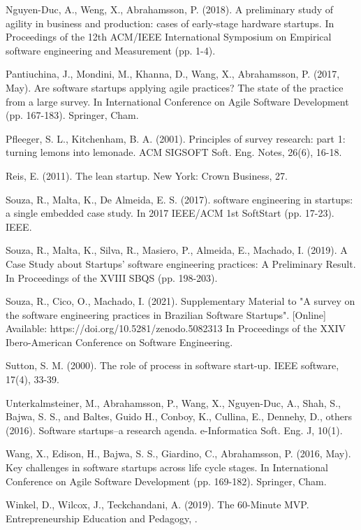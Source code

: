 \documentclass[runningheads]{llncs}
\begin{document}
\begin{thebibliography}{108}
Nguyen-Duc, A., Weng, X., Abrahamsson, P. (2018). A preliminary study of agility in business and production: cases of early-stage hardware startups. In Proceedings of the 12th ACM/IEEE International Symposium on Empirical software engineering and Measurement (pp. 1-4).

Pantiuchina, J., Mondini, M., Khanna, D., Wang, X., Abrahamsson, P. (2017, May). Are software startups applying agile practices? The state of the practice from a large survey. In International Conference on Agile Software Development (pp. 167-183). Springer, Cham.

Pfleeger, S. L., Kitchenham, B. A. (2001). 
Principles of survey research: part 1: turning lemons into lemonade. 
ACM SIGSOFT Soft. Eng. Notes, 26(6), 16-18.

Reis, E. (2011). 
The lean startup. 
New York: Crown Business, 27.

Souza, R., Malta, K., De Almeida, E. S. (2017). 
software engineering in startups: a single embedded case study. 
In 2017 IEEE/ACM 1st SoftStart (pp. 17-23). IEEE.


Souza, R., Malta, K., Silva, R., Masiero, P., Almeida, E., Machado, I. (2019). 
A Case Study about Startups' software engineering practices: A Preliminary Result. 
In Proceedings of the XVIII SBQS (pp. 198-203).

Souza, R., Cico, O., Machado, I. (2021). 
Supplementary Material to "A survey on the software engineering practices in Brazilian Software Startups". [Online] Available: https://doi.org/10.5281/zenodo.5082313
In Proceedings of the XXIV Ibero-American Conference on Software Engineering.

Sutton, S. M. (2000). 
The role of process in software start-up. 
IEEE software, 17(4), 33-39.

Unterkalmsteiner, M., Abrahamsson, P., Wang, X., Nguyen-Duc, A.,  Shah, S., Bajwa, S. S., and Baltes, Guido H., Conboy, K., Cullina, E., Dennehy, D., others (2016). 
Software startups–a research agenda. 
e-Informatica Soft. Eng. J, 10(1).

Wang, X., Edison, H., Bajwa, S. S., Giardino, C., Abrahamsson, P. (2016, May). Key challenges in software startups across life cycle stages. In International Conference on Agile Software Development (pp. 169-182). Springer, Cham.

Winkel, D., Wilcox, J., Teckchandani, A. (2019). 
The 60-Minute MVP. 
Entrepreneurship Education and Pedagogy, .

\end{thebibliography}
%
\end{document}
